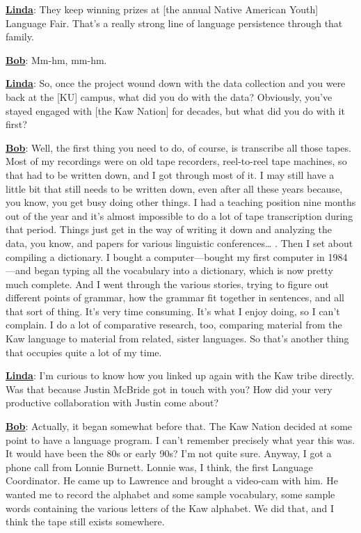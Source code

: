 \documentclass[output=paper]{LSP/langsci}
\begin{document}
\textbf{\underline{Linda}}: They keep winning prizes at [the annual Native American Youth] Language Fair. That's a really strong line of language persistence through that family.

\textbf{\underline{Bob}}: Mm-hm, mm-hm.

\textbf{\underline{Linda}}: So, once the project wound down with the data collection and you were back at the [KU] campus, what did you do with the data? Obviously, you've stayed engaged with [the Kaw Nation] for decades, but what did you do with it first?

\textbf{\underline{Bob}}: Well, the first thing you need to do, of course, is transcribe all those tapes. Most of my recordings were on old tape recorders, reel-to-reel tape machines, so that had to be written down, and I got through most of it. I may still have a little bit that still needs to be written down, even after all these years because, you know, you get busy doing other things. I had a teaching position nine months out of the year and it's almost impossible to do a lot of tape transcription during that period. Things just get in the way of writing it down and analyzing the data, you know, and papers for various linguistic conferences{\ldots} . Then I set about compiling a dictionary. I bought a computer---bought my first computer in 1984---and began typing all the vocabulary into a dictionary, which is now pretty much complete. And I went through the various stories, trying to figure out different points of grammar, how the grammar fit together in sentences, and all that sort of thing. It's very time consuming. It's what I enjoy doing, so I can't complain. I do a lot of comparative research, too, comparing material from the Kaw language to material from related, sister languages. So that's another thing that occupies quite a lot of my time.

\textbf{\underline{Linda}}: I'm curious to know how you linked up again with the Kaw tribe directly. Was that because Justin McBride got in touch with you? How did your very productive collaboration with Justin come about?

\textbf{\underline{Bob}}: Actually, it began somewhat before that. The Kaw Nation decided at some point to have a language program. I can't remember precisely what year this was. It would have been the 80s or early 90s? I'm not quite sure. Anyway, I got a phone call from Lonnie Burnett. Lonnie was, I think, the first Language Coordinator. He came up to Lawrence and brought a video-cam with him. He wanted me to record the alphabet and some sample vocabulary, some sample words containing the various letters of the Kaw alphabet. We did that, and I think the tape still exists somewhere.
\end{document}
